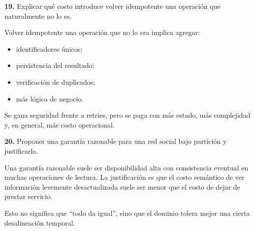 \documentclass[variant=guia,cover=institutional,mode=screen]{ua-engineering-v6-article}
\begin{document}
\begin{uaexercise}
\textbf{19.}
Explicar qué costo introduce volver idempotente una operación que naturalmente no lo es.
\end{uaexercise}
\begin{uaanswer}
Volver idempotente una operación que no lo era implica agregar:
\begin{itemize}
\item identificadores únicos;
\item persistencia del resultado;
\item verificación de duplicados;
\item más lógica de negocio.
\end{itemize}

Se gana seguridad frente a retries, pero se paga con más estado, más complejidad y, en general, más costo operacional.
\end{uaanswer}

\begin{uaexercise}
\textbf{20.}
Proponer una garantía razonable para una red social bajo partición y justificarla.
\end{uaexercise}
\begin{uaanswer}
Una garantía razonable suele ser disponibilidad alta con consistencia eventual en muchas operaciones de lectura.
La justificación es que el costo semántico de ver información levemente desactualizada suele ser menor que el costo de dejar de prestar servicio.

Esto no significa que “todo da igual”, sino que el dominio tolera mejor una cierta desalineación temporal.
\end{uaanswer}
\end{document}
